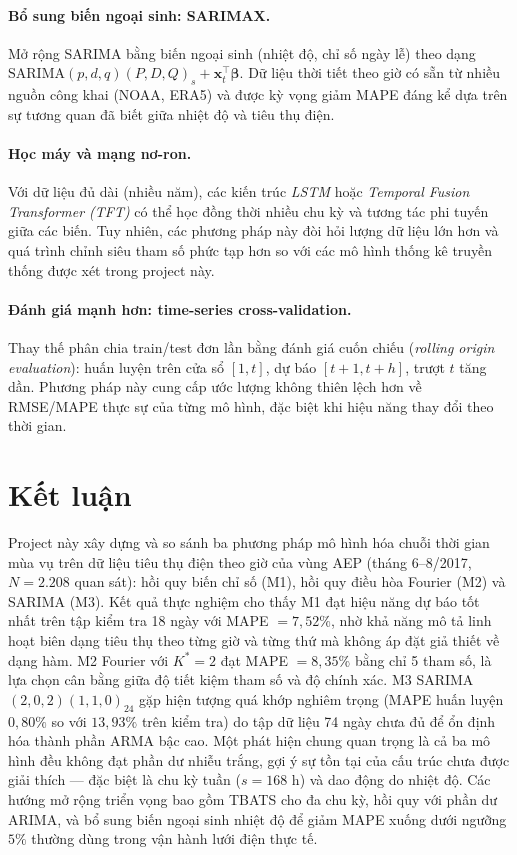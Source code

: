 \documentclass[12pt, a4paper]{article}
\theoremstyle{definition}
\begin{document}
\paragraph{Bổ sung biến ngoại sinh: SARIMAX.}
Mở rộng SARIMA bằng biến ngoại sinh (nhiệt độ, chỉ số ngày lễ) theo dạng
$\text{SARIMA}(p,d,q)(P,D,Q)_s + \mathbf{x}_t^\top\boldsymbol{\beta}$. Dữ liệu
thời tiết theo giờ có sẵn từ nhiều nguồn công khai (NOAA, ERA5) và được kỳ
vọng giảm MAPE đáng kể dựa trên sự tương quan đã biết giữa nhiệt độ và tiêu
thụ điện.

\paragraph{Học máy và mạng nơ-ron.}
Với dữ liệu đủ dài (nhiều năm), các kiến trúc \emph{LSTM} hoặc
\emph{Temporal Fusion Transformer (TFT)} có thể học đồng thời nhiều chu kỳ
và tương tác phi tuyến giữa các biến. Tuy nhiên, các phương pháp này đòi hỏi
lượng dữ liệu lớn hơn và quá trình chỉnh siêu tham số phức tạp hơn so với
các mô hình thống kê truyền thống được xét trong project này.

\paragraph{Đánh giá mạnh hơn: time-series cross-validation.}
Thay thế phân chia train/test đơn lần bằng đánh giá cuốn chiếu (\emph{rolling
origin evaluation}): huấn luyện trên cửa sổ $[1, t]$, dự báo $[t+1, t+h]$,
trượt $t$ tăng dần. Phương pháp này cung cấp ước lượng không thiên lệch hơn
về RMSE/MAPE thực sự của từng mô hình, đặc biệt khi hiệu năng thay đổi theo
thời gian.

\section{Kết luận}

Project này xây dựng và so sánh ba phương pháp mô hình hóa chuỗi thời gian mùa vụ trên dữ liệu tiêu thụ điện theo giờ của vùng AEP (tháng 6--8/2017, $N = 2.208$ quan sát): hồi quy biến chỉ số (M1), hồi quy điều hòa Fourier (M2) và SARIMA (M3). Kết quả thực nghiệm cho thấy M1 đạt hiệu năng dự báo tốt nhất trên tập kiểm tra 18 ngày với MAPE $= 7{,}52\%$, nhờ khả năng mô tả linh hoạt biên dạng tiêu thụ theo từng giờ và từng thứ mà không áp đặt giả thiết về dạng hàm. M2 Fourier với $K^* = 2$ đạt MAPE $= 8{,}35\%$ bằng chỉ 5 tham số, là lựa chọn cân bằng giữa độ tiết kiệm tham số và độ chính xác. M3 SARIMA$(2,0,2)(1,1,0)_{24}$ gặp hiện tượng quá khớp nghiêm trọng (MAPE huấn luyện $0{,}80\%$ so với $13{,}93\%$ trên kiểm tra) do tập dữ liệu 74 ngày chưa đủ để ổn định hóa thành phần ARMA bậc cao. Một phát hiện chung quan trọng là cả ba mô hình đều không đạt phần dư nhiễu trắng, gợi ý sự tồn tại của cấu trúc chưa được giải thích --- đặc biệt là chu kỳ tuần ($s = 168$ h) và dao động do nhiệt độ. Các hướng mở rộng triển vọng bao gồm TBATS cho đa chu kỳ, hồi quy với phần dư ARIMA, và bổ sung biến ngoại sinh nhiệt độ để giảm MAPE xuống dưới ngưỡng $5\%$ thường dùng trong vận hành lưới điện thực tế.
\end{document}
